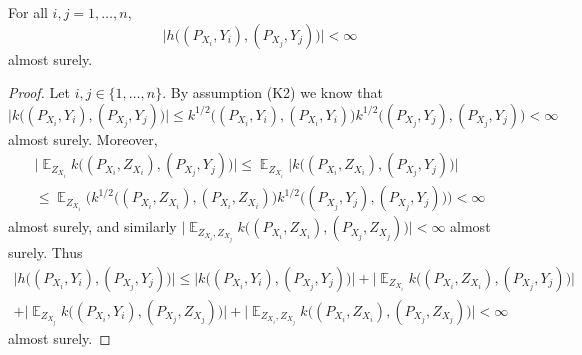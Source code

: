 \documentclass{article}
\DeclareMathOperator{\Exp}{\mathbb{E}}
\begin{document}
\begin{lemma}\label{lemma:hbound}
    For all $i, j = 1, \ldots, n$,
    \begin{equation*}
        \big|h\big((P_{X_i}, Y_i), (P_{X_j}, Y_j)\big)\big| < \infty
    \end{equation*}
    almost surely.
\end{lemma}

\begin{proof}
Let $i, j \in \{1, \ldots, n\}$. By assumption (K2) we know
that
\begin{equation*}
    \big| k\big((P_{X_i}, Y_i), (P_{X_j}, Y_j)\big) \big| \leq
    k^{1/2}\big((P_{X_i}, Y_i), (P_{X_i}, Y_i)\big) k^{1/2}\big((P_{X_j}, Y_j), (P_{X_j}, Y_j)\big) < \infty
\end{equation*}
almost surely. Moreover,
\begin{multline*}
    \big|\Exp_{Z_{X_i}} k\big((P_{X_i}, Z_{X_i}), (P_{X_j}, Y_j)\big) \big|
    \leq \Exp_{Z_{X_i}} \big| k\big((P_{X_i}, Z_{X_i}), (P_{X_j}, Y_j)\big) \big| \\
    \leq \Exp_{Z_{X_i}} \bigg(k^{1/2}\big((P_{X_i}, Z_{X_i}), (P_{X_i}, Z_{X_i})\big) k^{1/2}\big((P_{X_j}, Y_j), (P_{X_j}, Y_j)\big) \bigg) < \infty
\end{multline*}
almost surely, and similarly $\big|\Exp_{Z_{X_i}, Z_{X_j}} k\big((P_{X_i}, Z_{X_i}), (P_{X_j}, Z_{X_j})\big) \big| < \infty$
almost surely. Thus
\begin{multline*}
    \big|h\big((P_{X_i}, Y_i), (P_{X_j}, Y_j)\big)\big| \leq \big| k\big((P_{X_i}, Y_i), (P_{X_j}, Y_j)\big) \big| + \big|\Exp_{Z_{X_i}} k\big((P_{X_i}, Z_{X_i}), (P_{X_j}, Y_j)\big) \big| \\
    + \big|\Exp_{Z_{X_j}} k\big((P_{X_i}, Y_i), (P_{X_j}, Z_{X_j})\big) \big| + \big|\Exp_{Z_{X_i}, Z_{X_j}} k\big((P_{X_i}, Z_{X_i}), (P_{X_j}, Z_{X_j})\big) \big| < \infty
\end{multline*}
almost surely.
\end{proof}

\lemmaskceb*
\end{document}
